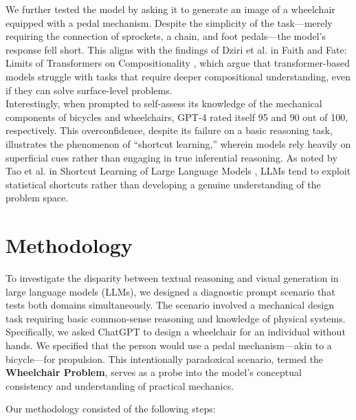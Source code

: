 \documentclass[11pt]{scrartcl}
\begin{document}
We further tested the model by asking it to generate an image of a wheelchair equipped with a pedal mechanism. Despite the simplicity of the task—merely requiring the connection of sprockets, a chain, and foot pedals—the model’s response fell short. This aligns with the findings of Dziri et al. in Faith and Fate: Limits of Transformers on Compositionality \cite{ref4}, which argue that transformer-based models struggle with tasks that require deeper compositional understanding, even if they can solve surface-level problems.\\

Interestingly, when prompted to self-assess its knowledge of the mechanical components of bicycles and wheelchairs, GPT-4 rated itself 95 and 90 out of 100, respectively. This overconfidence, despite its failure on a basic reasoning task, illustrates the phenomenon of “shortcut learning,” wherein models rely heavily on superficial cues rather than engaging in true inferential reasoning. As noted by Tao et al. in Shortcut Learning of Large Language Models \cite{ref5}, LLMs tend to exploit statistical shortcuts rather than developing a genuine understanding of the problem space.\\

\section*{Methodology}

To investigate the disparity between textual reasoning and visual generation in large language models (LLMs), we designed a diagnostic prompt scenario that tests both domains simultaneously. The scenario involved a mechanical design task requiring basic common-sense reasoning and knowledge of physical systems. Specifically, we asked ChatGPT to design a wheelchair for an individual without hands. We specified that the person would use a pedal mechanism—akin to a bicycle—for propulsion. This intentionally paradoxical scenario, termed the \textbf{Wheelchair Problem}, serves as a probe into the model's conceptual consistency and understanding of practical mechanics.

Our methodology consisted of the following steps:
\end{document}
